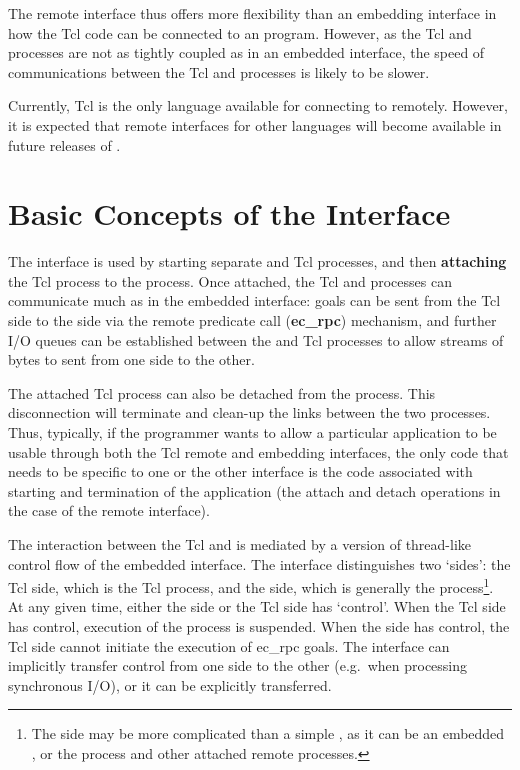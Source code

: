 The remote interface thus offers more flexibility than an embedding
interface in how the Tcl code can be connected to an {\eclipse}
program. However, as the Tcl and {\eclipse} processes are not as tightly
coupled as in an embedded interface, the speed of communications between
the Tcl and {\eclipse} processes is likely to be slower.

Currently, Tcl is the only language available for connecting to {\eclipse}
remotely. However, it is expected that remote interfaces for other
languages will become available in future releases of {\eclipse}. 

\section{Basic Concepts of the Interface}

The interface is used by starting separate {\eclipse} and Tcl processes, and
then {\bf attaching} the Tcl process to the {\eclipse} process. Once
attached, the Tcl and {\eclipse} processes can communicate much as in the
embedded interface: {\eclipse} goals can be sent from the Tcl side to the
{\eclipse} side via the remote predicate call ({\bf ec_rpc}) mechanism, 
and further I/O queues can be established between the {\eclipse} and Tcl
processes to allow streams of bytes to sent from one side to the other.

The attached Tcl
process can also be detached from the {\eclipse} process. This
disconnection will terminate and clean-up the links between the two
processes. Thus, typically, if the programmer wants to allow a particular
application to be usable through both the Tcl remote and embedding
interfaces, the only code that needs to be specific to one or the other
interface is the code associated with starting and termination of the
application (the attach and detach operations in the case of the remote
interface). 

The interaction between the Tcl and {\eclipse} is mediated by a version of
thread-like control flow of the embedded interface. The
interface distinguishes two `sides': the Tcl side, which is the Tcl
process, and the {\eclipse} side, which is generally the {\eclipse}
process\footnote{The {\eclipse} side may be more complicated than a simple {\eclipse}, as it can be
an embedded {\eclipse}, or the {\eclipse} process and other attached remote
processes.}. At any given time,
either the {\eclipse} side or the Tcl side has `control'. When the Tcl side
has control, execution of the {\eclipse} process is suspended. When the
{\eclipse} side has control, the Tcl side cannot initiate the execution of
ec_rpc goals. The interface can implicitly transfer control from one side
to the other (e.g.\ when processing synchronous I/O), or it can be
explicitly transferred.

